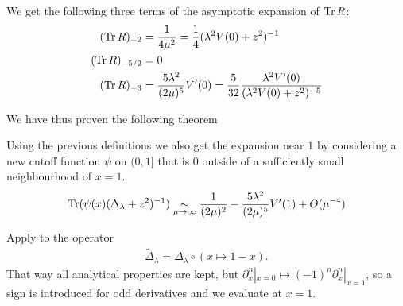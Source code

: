 We get the following three terms of the asymptotic expansion of $\operatorname{Tr} R$:
\begin{align}
  (\operatorname{Tr} R)_{-2} &= \frac{1}{4\mu^2} = \frac{1}{4} (\lambda^2V(0) + z^2)^{-1} \\
  (\operatorname{Tr} R)_{-5/2} &= 0 \\
    (\operatorname{Tr} R)_{-3} &= \frac{5\lambda^2}{(2\mu)^5} V'(0) =
  \frac{5}{32}\frac{\lambda^2 V'(0)}{(\lambda^2 V(0) + z^2)^{-5}}
\end{align}

We have thus proven the following theorem
\begin{MainTheorem}
  \label{main:boundary}
  
  \begin{Corollary}
    \label{cor:boundary}
    Using the previous definitions we also get the expansion near $1$ by
    considering a new cutoff function $\psi$ on $(0,1]$ that is $0$ outside of a
    sufficiently small neighbourhood of $x=1$.
    \begin{align*}
      \operatorname{Tr}(\psi(x)(\Delta_\lambda + z^2)^{-1}) \mathrel{\underset{\mu\to\infty}{\sim}}
      \frac{1}{(2\mu)^2} - \frac{5\lambda^2}{(2\mu)^5} V'(1) + O(\mu^{-4})
    \end{align*}
    \begin{Proof}
      Apply  to the operator
      \begin{align*}
        \tilde\Delta_\lambda = \Delta_\lambda\circ(x\mapsto 1-x).
      \end{align*}
      That way all analytical properties are kept, but $\partial_x^n|_{x=0}
      \mapsto (-1)^n \partial_x^n|_{x=1}$, so a sign is introduced for odd
      derivatives and we evaluate at $x=1$.
    \end{Proof}
  \end{Corollary}
\end{MainTheorem}
